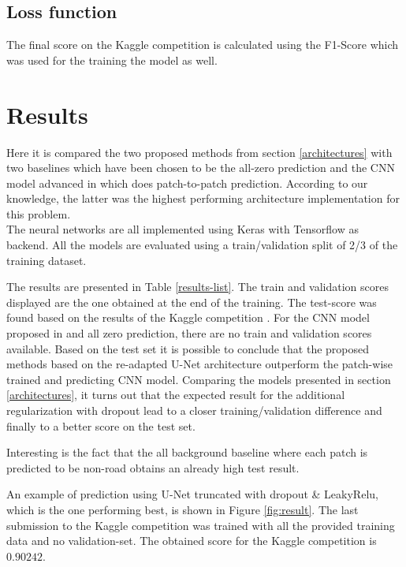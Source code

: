\documentclass[10pt,conference,compsocconf]{IEEEtran}
\begin{document}
\subsection{Loss function}

The final score on the Kaggle competition \cite{KaggleCompetition} is calculated using the F1-Score which was used for the training the model as well.

\section{Results}

Here it is compared the two proposed methods from section \ref{architectures} with two baselines which have been chosen to be the all-zero prediction and the CNN model advanced in \cite{Pavllo2017} which does patch-to-patch prediction. According to our knowledge, the latter was the highest performing architecture implementation for this problem. \\
The neural networks are all implemented using Keras with Tensorflow as backend. All the models are evaluated using a train/validation split of 2/3 of the training dataset.

The results are presented in Table \ref{results-list}. The train and validation scores displayed are the one obtained at the end of the training. The test-score was found based on the results of the Kaggle competition \cite{KaggleCompetition}. For the CNN model proposed in \cite{Pavllo2017} and all zero prediction, there are no train and validation scores available. Based on the test set it is possible to conclude that the proposed methods based on the re-adapted U-Net architecture outperform the patch-wise trained and predicting CNN model. Comparing the models presented in section \ref{architectures}, it turns out that the expected result for the additional regularization with dropout lead to a closer training/validation difference and finally to a better score on the test set.

Interesting is the fact that the all background baseline where each patch is predicted to be non-road obtains an already high test result.

An example of prediction using U-Net truncated with dropout \& LeakyRelu, which is the one performing best, is shown in Figure \ref{fig:result}. The last submission to the Kaggle competition was trained with all the provided training data and no validation-set. The obtained score for the Kaggle competition is $0.90242$.
\end{document}
